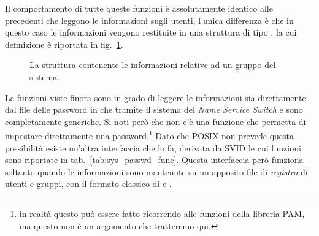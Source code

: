 Il comportamento di tutte queste funzioni è assolutamente identico alle
precedenti che leggono le informazioni sugli utenti, l'unica differenza è che
in questo caso le informazioni vengono restituite in una struttura di tipo
, la cui definizione è riportata in
fig.~\ref{fig:sys_group_struct}.

\begin{figure}[!htb]
  \footnotesize
  \centering
  \begin{minipage}[c]{0.8\textwidth}
  \end{minipage} 
  \normalsize 
  \caption{La struttura  contenente le informazioni relative ad
    un gruppo del sistema.}
  \label{fig:sys_group_struct}
\end{figure}

Le funzioni viste finora sono in grado di leggere le informazioni sia
direttamente dal file delle password in  che tramite il
sistema del \textit{Name Service Switch} e sono completamente generiche. Si
noti però che non c'è una funzione che permetta di impostare direttamente una
password.\footnote{in realtà questo può essere fatto ricorrendo alle funzioni
  della libreria PAM, ma questo non è un argomento che tratteremo qui.} Dato
che POSIX non prevede questa possibilità esiste un'altra interfaccia che lo
fa, derivata da SVID le cui funzioni sono riportate in
tab.~\ref{tab:sys_passwd_func}. Questa interfaccia però funziona soltanto
quando le informazioni sono mantenute su un apposito file di \textsl{registro}
di utenti e gruppi, con il formato classico di  e
.

